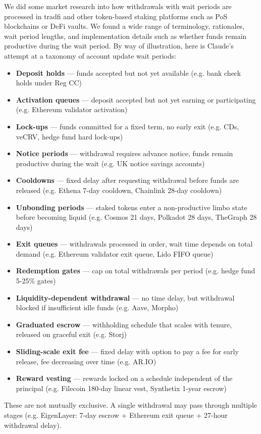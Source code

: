 We did some market research into how withdrawals with wait periods are processed in tradfi and other token-based staking platforms such as PoS blockchains or DeFi vaults.
%
We found a wide range of terminology, rationales, wait period lengths, and implementation details such as whether funds remain productive during the wait period.
%
By way of illustration, here is Claude's attempt at a taxonomy of account update wait periods:
%
\begin{itemize}
\item \textbf{Deposit holds} — funds accepted but not yet available (e.g. bank check holds under Reg CC)
\item \textbf{Activation queues} — deposit accepted but not yet earning or participating (e.g. Ethereum validator activation)
\item \textbf{Lock-ups} — funds committed for a fixed term, no early exit (e.g. CDs, veCRV, hedge fund hard lock-ups)
\item \textbf{Notice periods} — withdrawal requires advance notice, funds remain productive during the wait (e.g. UK notice savings accounts)
\item \textbf{Cooldowns} — fixed delay after requesting withdrawal before funds are released (e.g. Ethena 7-day cooldown, Chainlink 28-day cooldown)
\item \textbf{Unbonding periods} — staked tokens enter a non-productive limbo state before becoming liquid (e.g. Cosmos 21 days, Polkadot 28 days, TheGraph 28 days)
\item \textbf{Exit queues} — withdrawals processed in order, wait time depends on total demand (e.g. Ethereum validator exit queue, Lido FIFO queue)
\item \textbf{Redemption gates} — cap on total withdrawals per period (e.g. hedge fund 5-25\% gates)
\item \textbf{Liquidity-dependent withdrawal} — no time delay, but withdrawal blocked if insufficient idle funds (e.g. Aave, Morpho)
\item \textbf{Graduated escrow} — withholding schedule that scales with tenure, released on graceful exit (e.g. Storj)
\item \textbf{Sliding-scale exit fee} — fixed delay with option to pay a fee for early release, fee decreasing over time (e.g. AR.IO)
\item \textbf{Reward vesting} — rewards locked on a schedule independent of the principal (e.g. Filecoin 180-day linear vest, Synthetix 1-year escrow)
\end{itemize}
%
These are not mutually exclusive. A single withdrawal may pass through multiple stages (e.g. EigenLayer: 7-day escrow + Ethereum exit queue + 27-hour withdrawal delay).

